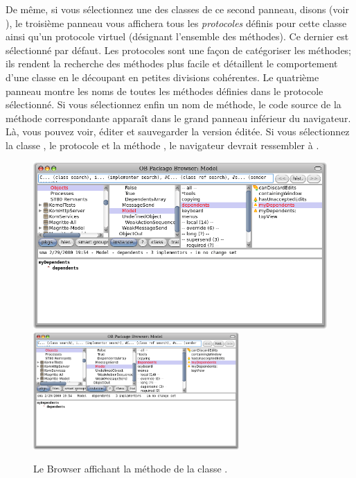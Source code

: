 \documentclass[a4paper,10pt,twoside]{book}
\begin{document}
De même, si vous sélectionnez une des classes de ce second panneau,
disons  (voir  ), le troisième
panneau vous affichera tous les \emph{protocoles} définis pour cette
classe ainsi qu'un protocole virtuel \mbox{} (désignant l'ensemble 
des méthodes). Ce dernier est sélectionné par défaut. 
Les protocoles sont une façon de catégoriser les méthodes;
ils rendent la recherche des méthodes plus facile et détaillent
le comportement d'une classe en le découpant en petites divisions 
cohérentes.
Le quatrième panneau montre les noms de toutes les méthodes définies dans le protocole sélectionné.
Si vous sélectionnez enfin un nom de méthode, le code source de la 
méthode correspondante apparaît dans le grand panneau inférieur
du navigateur. Là, vous pouvez voir, éditer et sauvegarder la version éditée.
Si vous sélectionnez la classe
\mbox{,} le protocole \mbox{} et la méthode 
\mbox{,} 
le navigateur devrait ressembler à .

\begin{figure}[htbp]
   \centering
   \ifluluelse
	   {\includegraphics[width=\textwidth]{SystemBrowserMyDependents}}
	   {\includegraphics[width=0.7\textwidth]{SystemBrowserMyDependents}}
   \caption{Le Browser affichant la méthode  de la classe .
   }
\end{figure}
\end{document}
